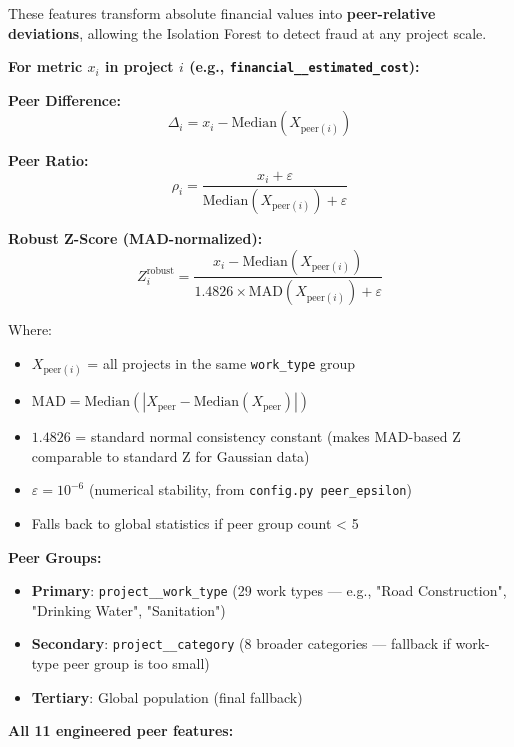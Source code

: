 \documentclass[11pt,a4paper]{article}
\begin{document}
These features transform absolute financial values into \textbf{peer-relative deviations}, allowing the Isolation Forest to detect fraud at any project scale.

\textbf{For metric $x_i$ in project $i$ (e.g., \texttt{financial\_\_estimated\_cost}):}

\textbf{Peer Difference:}
\[ \Delta_i = x_i - \text{Median}(X_{\text{peer}(i)}) \]

\textbf{Peer Ratio:}
\[ \rho_i = \frac{x_i + \varepsilon}{\text{Median}(X_{\text{peer}(i)}) + \varepsilon} \]

\textbf{Robust Z-Score (MAD-normalized):}
\[ Z_i^\text{robust} = \frac{x_i - \text{Median}(X_{\text{peer}(i)})}{1.4826 \times \text{MAD}(X_{\text{peer}(i)}) + \varepsilon} \]

Where:
\begin{itemize}[leftmargin=1.5em, itemsep=2pt, topsep=3pt]
\item $X_{\text{peer}(i)}$ = all projects in the same \texttt{work\_type} group
\item $\text{MAD} = \text{Median}(|X_\text{peer} - \text{Median}(X_\text{peer})|)$
\item $1.4826$ = standard normal consistency constant (makes MAD-based Z comparable to standard Z for Gaussian data)
\item $\varepsilon = 10^{-6}$ (numerical stability, from \texttt{config.py peer\_epsilon})
\item Falls back to global statistics if peer group count < 5
\end{itemize}

\textbf{Peer Groups:}
\begin{itemize}[leftmargin=1.5em, itemsep=2pt, topsep=3pt]
\item \textbf{Primary}: \texttt{project\_\_work\_type} (29 work types --- e.g., "Road Construction", "Drinking Water", "Sanitation")
\item \textbf{Secondary}: \texttt{project\_\_category} (8 broader categories --- fallback if work-type peer group is too small)
\item \textbf{Tertiary}: Global population (final fallback)
\end{itemize}

\textbf{All 11 engineered peer features:}
\end{document}
